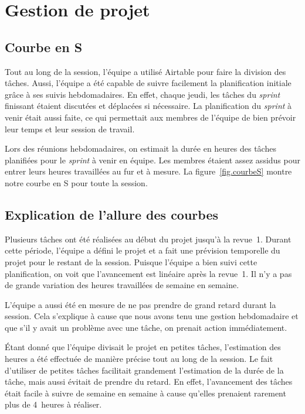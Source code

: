 \section{Gestion de projet}
	\subsection{Courbe en S}
	Tout au long de la session, l’équipe a utilisé Airtable pour faire la division des tâches. Aussi, l’équipe a été capable de suivre facilement la planification initiale grâce à ses suivis hebdomadaires. En effet, chaque jeudi, les tâches du \emph{sprint} finissant étaient discutées et déplacées si nécessaire. La planification du \emph{sprint} à venir était aussi faite, ce qui permettait aux membres de l’équipe de bien prévoir leur temps et leur session de travail. 

	Lors des réunions hebdomadaires, on estimait la durée en heures des tâches planifiées pour le \emph{sprint} à venir en équipe. Les membres étaient assez assidus pour entrer leurs heures travaillées au fur et à mesure. La figure~\ref{fig.courbeS} montre notre courbe en S pour toute la session.
	
	\subsection{Explication de l'allure des courbes}
	Plusieurs tâches ont été réalisées au début du projet jusqu'à la revue~1. Durant cette période, l’équipe a défini le projet et a fait une prévision temporelle du projet pour le restant de la session. Puisque l’équipe a bien suivi cette planification, on voit que l’avancement est linéaire après la revue~1. Il n’y a pas de grande variation des heures travaillées de semaine en semaine.

	L’équipe a aussi été en mesure de ne pas prendre de grand retard durant la session. Cela s’explique à cause que nous avons tenu une gestion hebdomadaire et que s’il y avait un problème avec une tâche, on prenait action immédiatement. 

	Étant donné que l’équipe divisait le projet en petites tâches, l’estimation des heures a été effectuée de manière précise tout au long de la session. Le fait d’utiliser de petites tâches facilitait grandement l’estimation de la durée de la tâche, mais aussi évitait de prendre du retard. En effet, l’avancement des tâches était facile à suivre de semaine en semaine à cause qu’elles prenaient rarement plus de 4~heures à réaliser.
	
